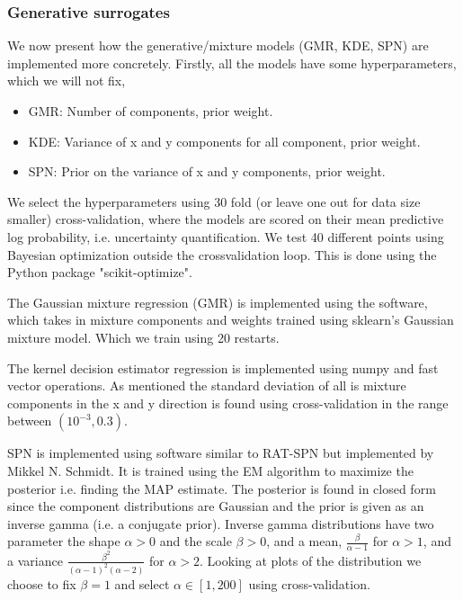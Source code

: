 \subsubsection{Generative surrogates}
We now present how the generative/mixture models (GMR, KDE, SPN) are implemented more concretely. Firstly, 
all the models have some hyperparameters, which we will not fix,  
\begin{itemize}[noitemsep]
  \item GMR: Number of components, prior weight. 
  \item KDE: Variance of x and y components for all component,  prior weight. 
  \item SPN: Prior on the variance of x and y components,  prior weight.
\end{itemize}
We select the hyperparameters using 30 fold (or leave one out for data size smaller) cross-validation, 
where the models are scored on their mean predictive log probability, i.e. uncertainty quantification. 
We test 40 different points using Bayesian optimization outside the crossvalidation loop. This is
done using the Python package "scikit-optimize". 

The Gaussian mixture regression (GMR) is implemented using the software\cite{GMR}, which takes in
mixture components and weights trained using sklearn's Gaussian mixture model. Which we train using
20 restarts.

The kernel decision estimator regression is implemented using numpy and fast vector operations. As
mentioned the standard deviation of all is mixture components in the x and y direction is found
using cross-validation in the range between $(10^{-3}, 0.3)$. 

SPN is implemented using software similar to RAT-SPN but implemented by Mikkel N. Schmidt. It is
trained using the EM algorithm to maximize the posterior i.e. finding the MAP estimate. The
posterior is found in closed form since the component distributions are Gaussian and the prior is
given as an inverse gamma (i.e. a conjugate prior). Inverse gamma distributions have two parameter
the shape $\alpha>0$ and the scale $\beta>0$, and a mean, $\frac{\beta}{\alpha-1}$ for $\alpha >1$, 
and a variance $\frac{\beta^2}{(\alpha-1)^2(\alpha-2)}$ for $\alpha >2$. Looking at plots of the
distribution we choose to fix $\beta =1$ and select $\alpha \in [1,200]$ using cross-validation. 

